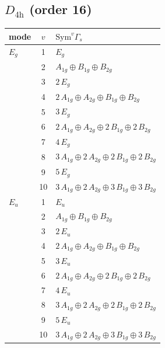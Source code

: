 \documentclass[11pt]{article}
\begin{document}
\subsection*{$D_{4\mathrm{h}}$ \quad (order 16)}
\begin{longtable}{l c p{}}
\hline mode & $v$ & $\mathrm{Sym}^v\Gamma_s$\\ \hline\endhead
$E_{g}$ & 1 & $E_{g}$\\
 & 2 & $A_{1g}\oplus B_{1g}\oplus B_{2g}$\\
 & 3 & $2\,E_{g}$\\
 & 4 & $2\,A_{1g}\oplus A_{2g}\oplus B_{1g}\oplus B_{2g}$\\
 & 5 & $3\,E_{g}$\\
 & 6 & $2\,A_{1g}\oplus A_{2g}\oplus 2\,B_{1g}\oplus 2\,B_{2g}$\\
 & 7 & $4\,E_{g}$\\
 & 8 & $3\,A_{1g}\oplus 2\,A_{2g}\oplus 2\,B_{1g}\oplus 2\,B_{2g}$\\
 & 9 & $5\,E_{g}$\\
 & 10 & $3\,A_{1g}\oplus 2\,A_{2g}\oplus 3\,B_{1g}\oplus 3\,B_{2g}$\\
\hline
$E_{u}$ & 1 & $E_{u}$\\
 & 2 & $A_{1g}\oplus B_{1g}\oplus B_{2g}$\\
 & 3 & $2\,E_{u}$\\
 & 4 & $2\,A_{1g}\oplus A_{2g}\oplus B_{1g}\oplus B_{2g}$\\
 & 5 & $3\,E_{u}$\\
 & 6 & $2\,A_{1g}\oplus A_{2g}\oplus 2\,B_{1g}\oplus 2\,B_{2g}$\\
 & 7 & $4\,E_{u}$\\
 & 8 & $3\,A_{1g}\oplus 2\,A_{2g}\oplus 2\,B_{1g}\oplus 2\,B_{2g}$\\
 & 9 & $5\,E_{u}$\\
 & 10 & $3\,A_{1g}\oplus 2\,A_{2g}\oplus 3\,B_{1g}\oplus 3\,B_{2g}$\\
\hline
\end{longtable}
\end{document}
